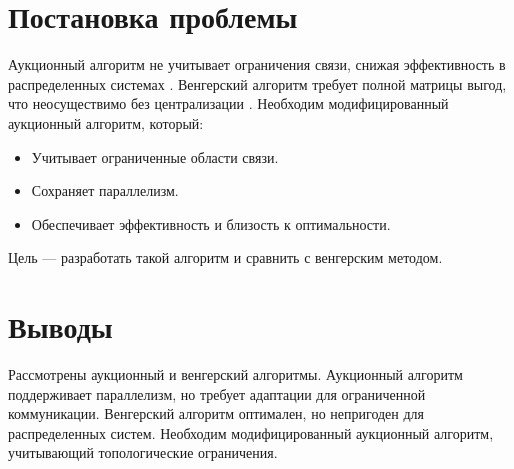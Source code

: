 \section{Постановка проблемы}
Аукционный алгоритм \cite{bertsekas1990} не учитывает ограничения связи, снижая эффективность в распределенных системах \cite{gerkey2003}. Венгерский алгоритм \cite{kuhn1955, emaxx2025} требует полной матрицы выгод, что неосуществимо без централизации \cite{kalyaev2009}. Необходим модифицированный аукционный алгоритм, который:
\begin{itemize}
    \item Учитывает ограниченные области связи.
    \item Сохраняет параллелизм.
    \item Обеспечивает эффективность и близость к оптимальности.
\end{itemize}

Цель --- разработать такой алгоритм и сравнить с венгерским методом.

\section{Выводы}
Рассмотрены аукционный \cite{bertsekas1990} и венгерский \cite{kuhn1955, emaxx2025} алгоритмы. Аукционный алгоритм поддерживает параллелизм, но требует адаптации для ограниченной коммуникации. Венгерский алгоритм оптимален, но непригоден для распределенных систем. Необходим модифицированный аукционный алгоритм, учитывающий топологические ограничения.

